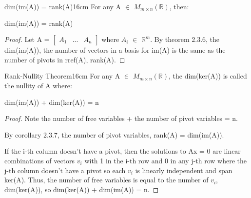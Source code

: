    \vspace{0.5cm}



    \begin{corollary}{dim(im(A)) = rank(A)}{16cm}
        For any A $\in$ $M_{m \times n}(\mathbb{R})$, then:

        \hspace{0.5cm}
        dim(im(A)) = rank(A)
    \end{corollary}

    \begin{proof}
        Let A =
        $\begin{bmatrix}
            A_1 & ... & A_n 
        \end{bmatrix}$ where $A_i$ $\in$ $\mathbb{R}^m$.
        By {\color{red} theorem 2.3.6}, the dim(im(A)),
        the number of vectors in a basis for im(A) is the
        same as the number of pivots in rref(A), rank(A).
    \end{proof}

    \vspace{0.5cm}



    \begin{wtheorem}{Rank-Nullity Theorem}{16cm}
        For any A $\in$ $M_{m \times n}(\mathbb{R})$,
        the dim(ker(A)) is called the {\color{lblue} nullity} of A where:

        \hspace{0.5cm}
        dim(im(A)) + dim(ker(A)) = n
    \end{wtheorem}

    \begin{proof}
        Note the number of free variables + the number of pivot variables = n.

        By {\color{orange} corollary 2.3.7},
        the number of pivot variables, rank(A) = dim(im(A)).
        
        If the i-th column doesn't have a pivot, then the solutions to Ax = 0
        are linear combinations of vectors $v_i$ with 1 in the i-th row
        and 0 in any j-th row where the j-th column doesn't have a pivot
        so each $v_i$ is linearly independent and span ker(A).
        Thus, the number of free variables is equal to
        the number of $v_i$, dim(ker(A)), so dim(ker(A)) + dim(im(A)) = n.
    \end{proof}

    \vspace{0.5cm}



